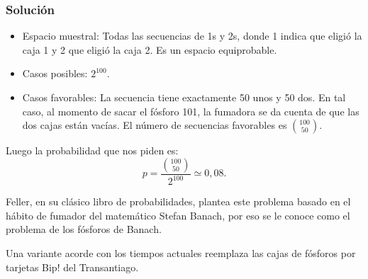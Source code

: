 \documentclass[9pt,handout]{beamer}
\begin{document}
\begin{frame}
\frametitle{Solución}

\begin{itemize}
\item Espacio muestral: Todas las secuencias de 1s  y 2s, donde 1 indica que eligió
la caja 1 y 2 que eligió la caja 2. Es un espacio equiprobable. 
\item Casos posibles: $2^{100}$. 
\item Casos favorables: La secuencia tiene exactamente 50 unos
y 50 dos. En tal caso, al momento de sacar el fósforo 101, 
la fumadora se da cuenta de que las dos cajas están vacías.
El número de secuencias favorables es $\binom{100}{50}$. 
\end{itemize}

\bigskip

Luego la probabilidad que nos piden es:
\[
p = \frac{\binom{100}{50}}{2^{100}} \simeq 0,08.
\]

\bigskip

Feller, en su clásico libro de probabilidades,
plantea este problema basado en el hábito
de fumador del matemático Stefan Banach, 
por eso se le conoce como el problema
de los fósforos de Banach. 

\bigskip

Una variante acorde con los tiempos
actuales reemplaza las cajas de fósforos
por tarjetas Bip! del Transantiago.
\end{frame}
\end{document}
